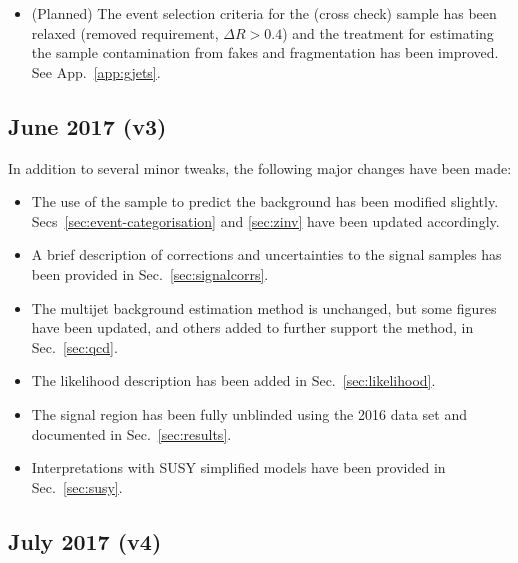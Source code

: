 \begin{itemize}
\item (Planned) The event selection criteria for the \gj (cross check)
  sample has been relaxed (removed \alphat requirement, $\Delta R >
  0.4$) and the treatment for estimating the sample contamination from
  fakes and fragmentation has been improved. See App.~\ref{app:gjets}.

\end{itemize}

\subsection{June  2017 (v3)}

In addition to several minor tweaks, the following major changes have
been made:
\begin{itemize}
\item The use of the \mmj sample to predict the \znunuj background has
  been modified slightly. Secs~\ref{sec:event-categorisation} and
  \ref{sec:zinv} have been updated accordingly.
\item A brief description of corrections and uncertainties to the
  signal samples has been provided in Sec.~\ref{sec:signalcorrs}.
\item The multijet background estimation method is unchanged, but some
  figures have been updated, and others added to further support the
  method, in Sec.~\ref{sec:qcd}. 
\item The likelihood description has been added in
  Sec.~\ref{sec:likelihood}. 
\item The signal region has been fully unblinded using the 2016 data
  set and documented in Sec.~\ref{sec:results}. 
\item Interpretations with SUSY simplified models have been provided
  in Sec.~\ref{sec:susy}. 
\end{itemize}

\subsection{July 2017 (v4)}

